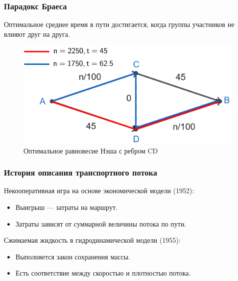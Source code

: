 \documentclass{beamer}
\begin{document}
\begin{frame}\frametitle{Парадокс Браеса}
	Оптимальное среднее время в пути достигается, когда группы участников не влияют друг на друга.
	\begin{figure}[H]
	\begin{center}
		\begin{minipage}[h]{0.60\linewidth}
			\includegraphics[width=1\linewidth]{imgs/braess_after_opt_short.png}
			\caption{Оптимальное равновесие Нэша с ребром CD}
			\label{ris:braess_3}
		\end{minipage}
	\end{center}
\end{figure}
\end{frame}

\begin{frame}\frametitle{История описания транспортного потока}
	Некооперативная игра на основе экономической модели (1952):
	\begin{itemize}
		\item Выигрыш --- затраты на маршрут.
		
		\item Затраты зависят от суммарной величины потока по пути. 
	\end{itemize}

	\bigskip

	Сжимаемая жидкость в гидродинамической модели (1955):
	\begin{itemize}
		\item Выполняется закон сохранения массы.
		
		\item Есть соответствие между скоростью и плотностью потока.
	\end{itemize}
\end{frame}
\end{document}
